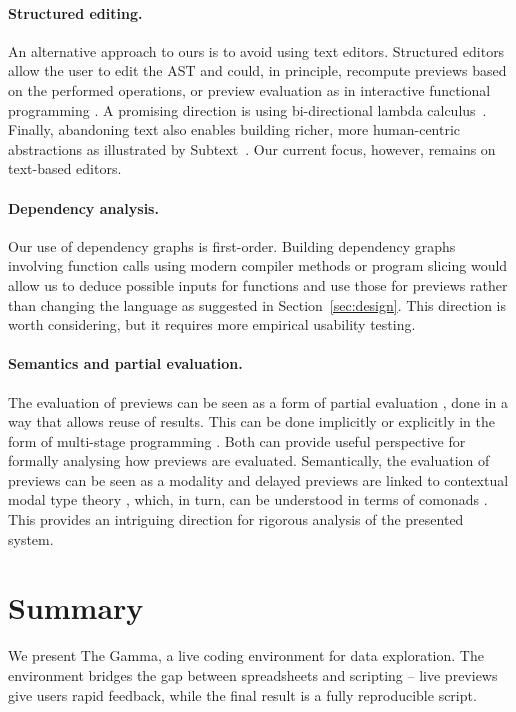 \documentclass[acmsmall,anonymous,fleqn]{acmart}\settopmatter{printfolios=false,printccs=false,printacmref=false}
\theoremstyle{plain}
\theoremstyle{definition}
\begin{document}
\paragraph{Structured editing.}
An alternative approach to ours is to avoid using text editors. Structured editors
\cite{structure-based} allow the user to edit the AST and could, in principle, recompute previews
based on the performed operations, or preview evaluation as in interactive functional programming
\cite{interactive}. A promising direction is using bi-directional lambda calculus~\cite{hazelnut}.
Finally, abandoning text also enables building richer, more human-centric
abstractions as illustrated by Subtext~\cite{subtext}. Our current focus, however, remains
on text-based editors.

\paragraph{Dependency analysis.}
Our use of dependency graphs \cite{dependencies} is first-order. Building dependency graphs
involving function calls using modern compiler methods \cite{optimizing} or program slicing
\cite{slicing} would allow us to deduce possible inputs for functions and use those for
previews rather than changing the language as suggested in Section~\ref{sec:design}. This direction
is worth considering, but it requires more empirical usability testing.

\paragraph{Semantics and partial evaluation.}
The evaluation of previews can be seen as a form of partial evaluation \cite{partial}, done in a
way that allows reuse of results. This can be done implicitly or explicitly in the form of
multi-stage programming \cite{metaml}. Both can provide useful perspective for formally analysing
how previews are evaluated. Semantically, the evaluation of previews can be seen as a modality
\cite{modal} and delayed previews are linked to contextual modal type theory \cite{cmtt}, which,
in turn, can be understood in terms of comonads \cite{cmtt-denotation}. This provides an intriguing
direction for rigorous analysis of the presented system.


\section{Summary}
We present The Gamma, a live coding environment for data exploration. The environment
bridges the gap between spreadsheets and scripting -- live previews give users rapid feedback,
while the final result is a fully reproducible script.
\end{document}
